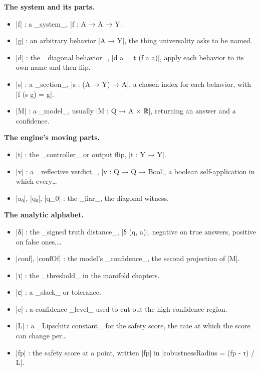\documentclass{memoir}
\begin{document}
\textbf{The system and its parts.}

\begin{itemize}
\item \LeanVerb|f| : a \_system\_, \LeanVerb|f : A → A → Y|.
\item \LeanVerb|g| : an arbitrary behavior \LeanVerb|A → Y|, the thing universality asks to be named.
\item \LeanVerb|d| : the \_diagonal behavior\_, \LeanVerb|d a = t (f a a)|, apply each behavior to its
   own name and then flip.
\item \LeanVerb|s| : a \_section\_, \LeanVerb|s : (A → Y) → A|, a chosen index for each behavior, with \LeanVerb|f (s g) = g|.
\item \LeanVerb|M| : a \_model\_, usually \LeanVerb|M : Q → A × ℝ|, returning an answer and a confidence.

\end{itemize}


\textbf{The engine's moving parts.}

\begin{itemize}
\item \LeanVerb|t| : the \_controller\_ or output flip, \LeanVerb|t : Y → Y|.
\item \LeanVerb|v| : a \_reflective verdict\_, \LeanVerb|v : Q → Q → Bool|, a boolean self-application in
   which every…
\item \LeanVerb|a₀|, \LeanVerb|q₀|, \LeanVerb|q_0| : the \_liar\_, the diagonal witness.

\end{itemize}


\textbf{The analytic alphabet.}

\begin{itemize}
\item \LeanVerb|δ| : the \_signed truth distance\_, \LeanVerb|δ (q, a)|, negative on true answers,
   positive on false ones,…
\item \LeanVerb|conf|, \LeanVerb|confOf| : the model's \_confidence\_, the second projection of \LeanVerb|M|.
\item \LeanVerb|τ| : the \_threshold\_ in the manifold chapters.
\item \LeanVerb|ε| : a \_slack\_ or tolerance.
\item \LeanVerb|c| : a confidence \_level\_ used to cut out the high-confidence region.
\item \LeanVerb|L| : a \_Lipschitz constant\_ for the safety score, the rate at which the score
   can change per…
\item \LeanVerb|fp| : the safety score at a point, written \LeanVerb|fp| in \LeanVerb|robustnessRadius = (fp - τ) / L|.

\end{itemize}
\end{document}
